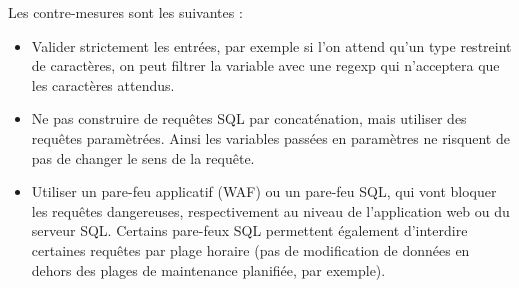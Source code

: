 Les contre-mesures sont les suivantes :
\begin{tabbing}
\end{tabbing}
\begin{itemize}
\item Valider strictement les entrées, par exemple si l'on attend qu'un type restreint de caractères, on peut filtrer la variable avec une regexp qui n'acceptera que les caractères attendus.
\item Ne pas construire de requêtes SQL par concaténation, mais utiliser des requêtes paramètrées. Ainsi les variables passées en paramètres ne risquent de pas de changer le sens de la requête.
\item Utiliser un pare-feu applicatif (WAF) ou un pare-feu SQL, qui vont bloquer les requêtes dangereuses, respectivement au niveau de l'application web ou du serveur SQL. Certains pare-feux SQL permettent également d'interdire certaines requêtes par plage horaire (pas de modification de données en dehors des plages de maintenance planifiée, par exemple).
\end{itemize}

\endinput
